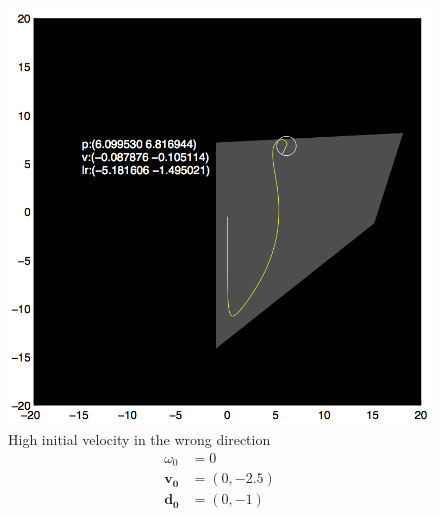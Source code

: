 \documentclass{report}
\begin{document}
\begin{figure}
\begin{minipage}{\linewidth}
\begin{minipage}[t]{0.45\linewidth}
    \includegraphics[width=\linewidth]{fig3.png}
    \captionsetup{singlelinecheck=off}
    \caption[.]{\label{fig:fig3}High initial velocity in the wrong direction\begin{align*}
    \omega_0 &= 0 \\
    \mathbf{v_0} &= (0, -2.5)\\
    \mathbf{d_0} &= (0, -1)
    \end{align*}
    }
\end{minipage}
\hfill
\begin{minipage}[t]{0.45\linewidth}
    \centering
    

\end{minipage}
\end{minipage}
\end{figure}
\end{document}
